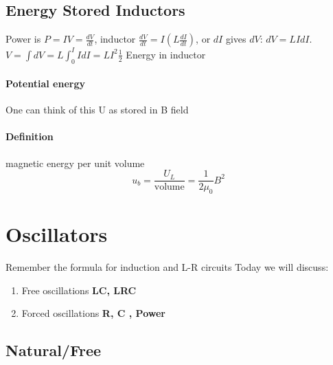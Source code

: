 \documentclass{article}
\begin{document}
    \subsection{Energy Stored Inductors}
    Power is $P = IV = \frac{dV}{dt}$, inductor $\frac{dV}{dt} = I (L\frac{dI}{dt})$,
    or $dI$ gives $dV$: $dV = LIdI$. 
    $V = \int dV = L \int^I_0IdI = LI^2\frac{1}{2}$
    Energy in inductor 
    \paragraph{Potential energy} One can think of this U as stored in B field
    \paragraph{Definition}magnetic energy per unit volume $$u_b = \frac{U_L}{\text{volume}} = \frac{1}{2\mu_0}B^2$$
    \section{Oscillators}
    Remember the formula for induction and L-R circuits
    Today we will discuss:
    \begin{enumerate}
        \item Free oscillations \textbf{LC, LRC}
        \item Forced oscillations \textbf{R, C , Power}
    \end{enumerate}
    \subsection{Natural/Free}
\end{document}
